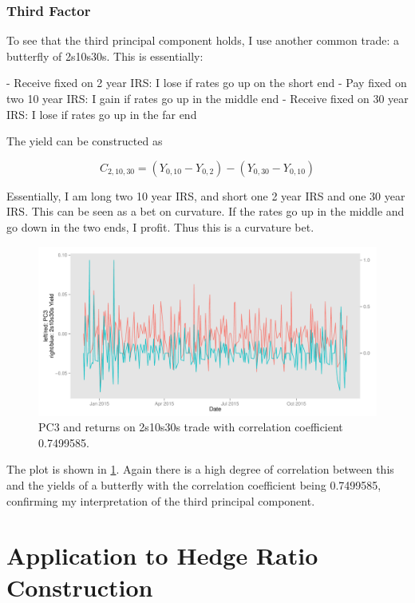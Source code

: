 \documentclass[11pt]{scrreprt}
\begin{document}
\subsection{Third Factor}

To see that the third principal component holds, I use another common trade: a butterfly of 2s10s30s. This is essentially:

- Receive fixed on 2 year IRS: I lose if rates go up on the short end
- Pay fixed on two 10 year IRS: I gain if rates go up in the middle end
- Receive fixed on 30 year IRS: I lose if rates go up in the far end

The yield can be constructed as

$$C_{2,10,30} = \left(Y_{0,10} - Y_{0,2}\right) - \left(Y_{0,30} - Y_{0,10}\right)$$

Essentially, I am long two 10 year IRS, and short one 2 year IRS and one 30 year IRS. This can be seen as a bet on curvature. If the rates go up in the middle and go down in the two ends, I profit. Thus this is a curvature bet.

\begin{figure}[H]
\centering\includegraphics[width=\textwidth]{verify-third.pdf}
\caption{PC3 and returns on 2s10s30s trade with correlation coefficient 0.7499585.}
\label{fig:verify-third}
\end{figure}

The plot is shown in \ref{fig:verify-third}. Again there is a high degree of correlation between this and the yields of a butterfly with the correlation coefficient being 0.7499585, confirming my interpretation of the third principal component.

\chapter{Application to Hedge Ratio Construction}
\end{document}
